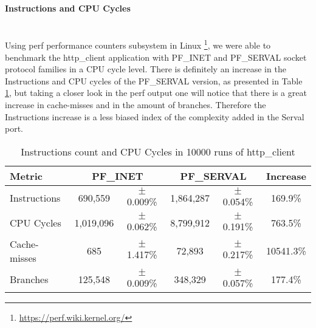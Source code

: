 \newpage
\paragraph{Instructions and CPU Cycles} \hfill \\
Using perf performance counters subsystem in Linux \footnote{\url{https://perf.wiki.kernel.org/}}, we were able to benchmark the http\_client application with PF\_INET and PF\_SERVAL socket protocol families in a CPU cycle level.
There is definitely an increase in the Instructions and CPU cycles of the PF\_SERVAL version, as presented in Table \ref{table:cpu}, but taking a closer look in the perf output one will notice that there is a great increase in cache-misses and in the amount of branches.
Therefore the Instructions increase is a less biased index of the complexity added in the Serval port.
\begin{table}
\begin{center}
  \begin{tabular}{l||cc|cc|c}
  	\toprule
  	Metric			&	\multicolumn{2}{c}{PF\_INET}	&	\multicolumn{2}{c}{PF\_SERVAL}	&	Increase	\\
  	\midrule
    Instructions	&	690,559		&	$\pm$0.009\%	&	1,864,287	&	$\pm$0.054\%	&	169.9\%		\\
    CPU Cycles		&	1,019,096	&	$\pm$0.062\%	&	8,799,912	&	$\pm$0.191\%	&	763.5\%		\\
    Cache-misses	&	685			&	$\pm$1.417\%	&	72,893		&	$\pm$0.217\%	&	10541.3\%		\\
    Branches		&	125,548		&	$\pm$0.009\%	&	348,329		&	$\pm$0.057\%	&	177.4\%		\\
    \bottomrule
  \end{tabular}
  \caption[Benchmark: Instructions and CPU Cycles]{Instructions count and CPU Cycles in 10000 runs of http\_client}
  \label{table:cpu}
\end{center}
\end{table}

